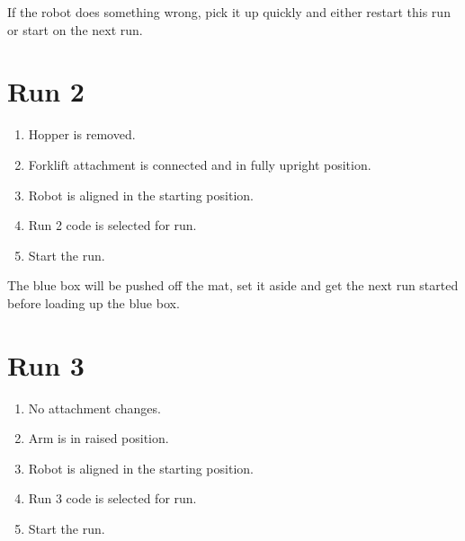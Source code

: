 \documentclass[letter, article]{article}
\begin{document}
\begin{tcolorbox}[title=Note:]
\small If the robot does something wrong, pick it up quickly and either restart this run or start on the next run. 
\end{tcolorbox}

\section{Run 2}

\begin{enumerate}\footnotesize
    \item Hopper is removed.
    \item Forklift attachment is connected and in fully upright position.
    \item Robot is aligned in the starting position.
    \item Run 2 code is selected for run.
    \item Start the run.
\end{enumerate}

\begin{tcolorbox}[title=Note:]
\small The blue box will be pushed off the mat, set it aside and get the next run started before loading up the blue box.
\end{tcolorbox}

\section{Run 3}

\begin{enumerate}\footnotesize
    \item No attachment changes.
    \item Arm is in raised position.
    \item Robot is aligned in the starting position.
    \item Run 3 code is selected for run.
    \item Start the run.
\end{enumerate}
\end{document}
